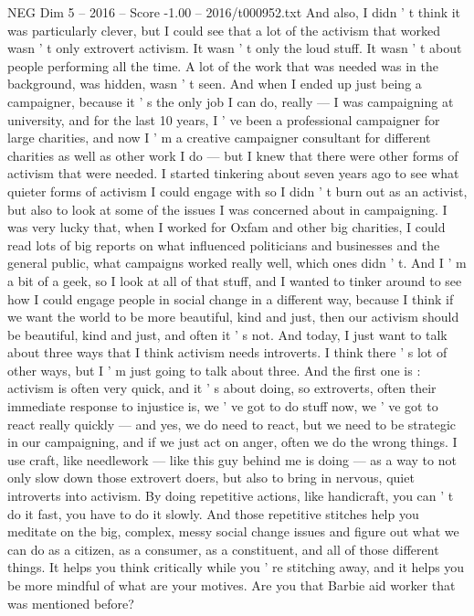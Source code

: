 \begin{textsample}{NEG Dim 5 – 2016 – Score -1.00 – 2016/t000952.txt}
And also, I didn ' t think it was particularly clever, but I could see that a lot of the activism that worked wasn ' t only extrovert activism.
It wasn ' t only the loud stuff.
It wasn ' t about people performing all the time.
A lot of the work that was needed was in the background, was hidden, wasn ' t seen.
And when I ended up just being a campaigner, because it ' s the only job I can do, really — I was campaigning at university, and for the last 10 years, I ' ve been a professional campaigner for large charities, and now I ' m a creative campaigner consultant for different charities as well as other work I do — but I knew that there were other forms of activism that were needed.
I started tinkering about seven years ago to see what quieter forms of activism I could engage with so I didn ' t burn out as an activist, but also to look at some of the issues I was concerned about in campaigning.
I was very lucky that, when I worked for Oxfam and other big charities, I could read lots of big reports on what influenced politicians and businesses and the general public, what campaigns worked really well, which ones didn ' t.
And I ' m a bit of a geek, so I look at all of that stuff, and I wanted to tinker around to see how I could engage people in social change in a different way, because I think if we want the world to be more beautiful, kind and just, then our activism should be beautiful, kind and just, and often it ' s not.
And today, I just want to talk about three ways that I think activism needs introverts.
I think there ' s lot of other ways, but I ' m just going to talk about three.
And the first one is : activism is often very quick, and it ' s about doing, so extroverts, often their immediate response to injustice is, we ' ve got to do stuff now, we ' ve got to react really quickly — and yes, we do need to react, but we need to be strategic in our campaigning, and if we just act on anger, often we do the wrong things.
I use craft, like needlework — like this guy behind me is doing — as a way to not only slow down those extrovert doers, but also to bring in nervous, quiet introverts into activism.
By doing repetitive actions, like handicraft, you can ' t do it fast, you have to do it slowly.
And those repetitive stitches help you meditate on the big, complex, messy social change issues and figure out what we can do as a citizen, as a consumer, as a constituent, and all of those different things.
It helps you think critically while you ' re stitching away, and it helps you be more mindful of what are your motives.
Are you that Barbie aid worker that was mentioned before?

\end{textsample}
